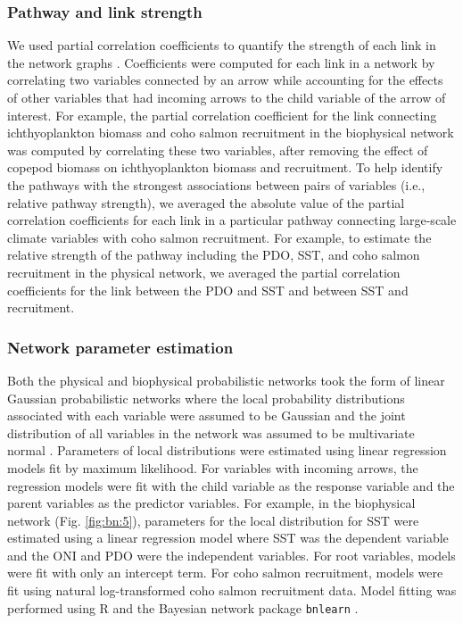 \subsubsection{Pathway and link strength}

We used partial correlation coefficients to quantify the strength of each link
in the network graphs \citep{Zar1999a, Scutari2010, Yang2011}.  Coefficients
were computed for each link in a network by correlating two variables connected
by an arrow while accounting for the effects of other variables that had
incoming arrows to the child variable of the arrow of interest. For example, the
partial correlation coefficient for the link connecting ichthyoplankton biomass
and coho salmon recruitment in the biophysical network was computed by
correlating these two variables, after removing the effect of copepod biomass on
ichthyoplankton biomass and recruitment. To help identify the pathways with the
strongest associations between pairs of variables (i.e., relative pathway
strength), we averaged the absolute value of the partial correlation
coefficients for each link in a particular pathway connecting large-scale
climate variables with coho salmon recruitment.  For example, to estimate the
relative strength of the pathway including the PDO, SST, and coho salmon
recruitment in the physical network, we averaged the partial correlation
coefficients for the link between the PDO and SST and between SST and
recruitment.


\subsubsection{Network parameter estimation}

Both the physical and biophysical probabilistic networks took the form of linear
Gaussian probabilistic networks where the local probability distributions
associated with each variable were assumed to be Gaussian and the joint
distribution of all variables in the network was assumed to be multivariate
normal \citep{Shachter1989a, Koller2009a}. Parameters of local distributions
were estimated using linear regression models fit by maximum likelihood. For
variables with incoming arrows, the regression models were fit with the child
variable as the response variable and the parent variables as the predictor
variables. For example, in the biophysical network (Fig. \ref{fig:bn:5}), parameters for the
local distribution for SST were estimated using a linear regression model where
SST was the dependent variable and the ONI and PDO were the independent
variables. For root variables, models were fit with only an intercept term. For
coho salmon recruitment, models were fit using natural log-transformed coho
salmon recruitment data. Model fitting was performed using R and the Bayesian
network package \texttt{bnlearn} \citep{Scutari2010, Rcore2013a}.

